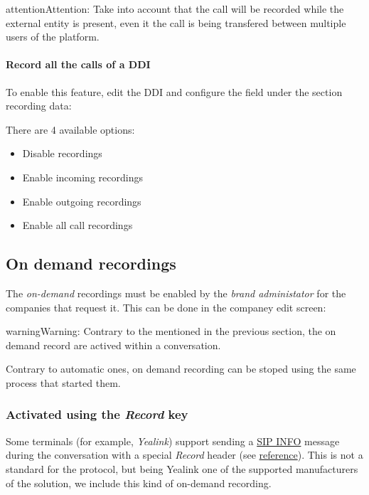 \documentclass[letterpaper,10pt,english]{sphinxmanual}
\begin{document}
\begin{notice}{attention}{Attention:}
Take into account that the call will be recorded while the
external entity is present, even it the call is being transfered between
multiple users of the platform.
\end{notice}
\paragraph{Record all the calls of a DDI}

To enable this feature, edit the DDI and configure the field under the section
recording data:

\noindent{}

There are 4 available options:
\begin{itemize}
\item {} 
Disable recordings

\item {} 
Enable incoming recordings

\item {} 
Enable outgoing recordings

\item {} 
Enable all call recordings

\end{itemize}


\subsection{On demand recordings}
\label{pbx_features/call_recording:on-demand-recordings}
The \emph{on-demand} recordings must be enabled by the \emph{brand administator} for the
companies that request it. This can be done in the companey edit screen:

\noindent{}

\begin{notice}{warning}{Warning:}
Contrary to the {\hyperref[pbx_features/services:services]{}} mentioned in the
previous section, the on demand record are actived within a conversation.
\end{notice}

Contrary to automatic ones, on demand recording can be stoped using the same
process that started them.


\subsubsection{Activated using the \emph{Record} key}
\label{pbx_features/call_recording:activated-using-the-record-key}
Some terminals (for example, \emph{Yealink}) support sending a \href{https://tools.ietf.org/html/rfc6086}{SIP INFO} message during the conversation with a
special \emph{Record} header (see \href{http://www.yealink.com/Upload/document/UsingCallRecordingFeatureonYealinkPhones/UsingCallRecordingFeatureonYealinkSIPT2XPphonesRev\_610-20561729764.pdf}{reference}).
This is not a standard for the protocol, but being Yealink one of the supported
manufacturers of the solution, we include this kind of on-demand recording.
\end{document}

